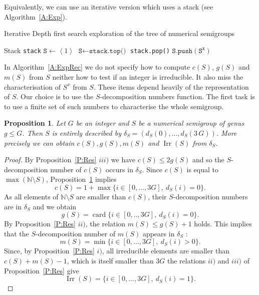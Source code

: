 \documentclass[reqno,11pt]{amsart}
\theoremstyle{plain}
\newtheorem{prop}{Proposition}[section]
\theoremstyle{definition}
\renewcommand{\leq}{\leqslant}
\newcommand{\NN}{\mathbb{N}}
\renewcommand{\tt}[1]{\texttt{#1}}
\DeclareMathOperator{\Irr}{Irr}
\DeclareMathOperator{\card}{card}
\begin{document}
Equivalently, we can use an iterative version which uses a stack (see Algorithm~\ref{A:Exp}).
\begin{algorithm}
\caption{Iterative Depth first search exploration of the tree of numerical semigroups}\label{A:Exp}
\small
\begin{algorithmic}[1]
\Procedure{Explore}{\tt{G}}
\State Stack \tt{stack} 
\State $\tt{S} \gets\left<1\right>$
	\State $\tt{S} \gets \tt{stack.top()}$
	\State \tt{stack.pop()}
	\If{$g(\tt{S})< \tt{G}$}
		\For{\tt{x} from $c(\tt{S})$ to $c(\tt{S})+m(\tt{S})$}
			\If{$\tt{x}\in \Irr(\tt{S})$}
				\State $\tt{S.push}(\tt{S}^\tt{x})$
			\EndIf
		\EndFor
	\EndIf
\EndWhile
\EndProcedure
\end{algorithmic}
\end{algorithm}

In Algorithm~\ref{A:ExpRec} we do not specify how to compute $c(S)$, $g(S)$ and $m(S)$  from $S$ neither how to test if an integer is irreducible. 
It also miss  the characterisation of $S^x$ from $S$.
These items depend heavily of the representation of $S$.
Our choice is to use the $S$-decomposition numbers function. 
The first task is to use a finite set of such numbers to characterise the whole semigroup.

\begin{prop}
\label{P:delta}
Let $G$ be an integer and $S$ be a numerical semigroup of genus $g\leq G$.
Then $S$ is entirely described by $\delta_S=(d_S(0),...,d_S(3\,G))$. More precisely we can obtain $c(S), g(S), m(S)$ and $\Irr(S)$ from $\delta_S$.
\end{prop} 

\begin{proof}
By Proposition~\ref{P:Res} $iii)$ we have $c(S)\leq 2g(S)$ and so the $S$-decomposition number of $c(S)$ occurs in $\delta_S$.
Since $c(S)$ is equal to $\max(\NN\setminus S)$, Proposition~\ref{P:delta} implies 
\[
c(S)=1+\max\{i\in[0,...,3G],\ d_S(i)=0\}.
\]
As all elements of $\NN\setminus S$ are smaller than $c(S)$, their $S$-decomposition numbers are in $\delta_S$ and we obtain
\[
g(S)=\card\{i\in[0,..,3G],\ d_S(i)=0\}.
\]
By Proposition~\ref{P:Res} $ii)$, the relation $m(S)\leq g(S)+1$ holds. 
This implies that the $S$-decomposition number of $m(S)$ appears in $\delta_S$ : 
\[
m(S)=\min\{i\in[0,...,3G],\ d_S(i)>0\}.
\]
Since, by Proposition~\ref{P:Res} $i)$,  all irreducible elements are smaller than $c(S)+m(S)-1$, which is itself smaller than $3G$ the relations $ii)$ and $iii)$ of Proposition~\ref{P:Res} give
\[
\Irr(S)=\{i\in[0,...,3G],\ d_S(i)=1\}.
\]
\end{proof}
\end{document}
